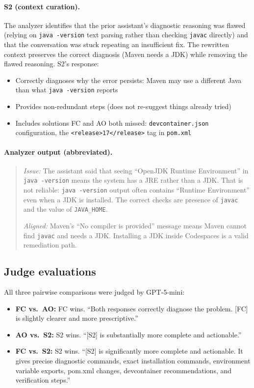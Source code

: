 \documentclass{article} %
\begin{document}
\paragraph{S2 (context curation).} The analyzer identifies that the prior assistant's diagnostic reasoning was flawed (relying on \texttt{java -version} text parsing rather than checking \texttt{javac} directly) and that the conversation was stuck repeating an insufficient fix. The rewritten context preserves the correct diagnosis (Maven needs a JDK) while removing the flawed reasoning. S2's response:
\begin{itemize}
    \item Correctly diagnoses why the error persists: Maven may use a different Java than what \texttt{java -version} reports
    \item Provides non-redundant steps (does not re-suggest things already tried)
    \item Includes solutions FC and AO both missed: \texttt{devcontainer.json} configuration, the \texttt{\textless release\textgreater 17\textless /release\textgreater} tag in \texttt{pom.xml}
\end{itemize}

\paragraph{Analyzer output (abbreviated).}
\begin{quote}
\emph{Issue:} The assistant said that seeing ``OpenJDK Runtime Environment'' in \texttt{java -version} means the system has a JRE rather than a JDK. That is not reliable: \texttt{java -version} output often contains ``Runtime Environment'' even when a JDK is installed. The correct checks are presence of \texttt{javac} and the value of \texttt{JAVA\_HOME}.

\emph{Aligned:} Maven's ``No compiler is provided'' message means Maven cannot find \texttt{javac} and needs a JDK. Installing a JDK inside Codespaces is a valid remediation path.
\end{quote}

\subsection{Judge evaluations}

All three pairwise comparisons were judged by GPT-5-mini:

\begin{itemize}
    \item \textbf{FC vs.\ AO:} FC wins. ``Both responses correctly diagnose the problem. [FC] is slightly clearer and more prescriptive.''
    \item \textbf{AO vs.\ S2:} S2 wins. ``[S2] is substantially more complete and actionable.''
    \item \textbf{FC vs.\ S2:} S2 wins. ``[S2] is significantly more complete and actionable. It gives precise diagnostic commands, exact installation commands, environment variable exports, pom.xml changes, devcontainer recommendations, and verification steps.''
\end{itemize}
\end{document}
